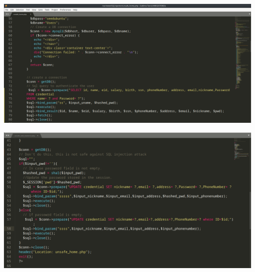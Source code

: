 \begin{center}
			\includegraphics[width=1\textwidth]{image/4.2.PNG}		
\end{center}

\begin{center}
			\includegraphics[width=1\textwidth]{image/4.3.PNG}		
\end{center}

